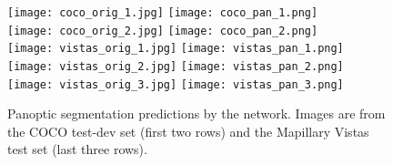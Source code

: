 \documentclass[10pt,twocolumn,letterpaper]{article}
\begin{document}
\begin{figure}[t]
\centering
\texttt{[image: coco\_orig\_1.jpg]}
\texttt{[image: coco\_pan\_1.png]}\\
\texttt{[image: coco\_orig\_2.jpg]}
\texttt{[image: coco\_pan\_2.png]}\\
\texttt{[image: vistas\_orig\_1.jpg]}
\texttt{[image: vistas\_pan\_1.png]}\\
\texttt{[image: vistas\_orig\_2.jpg]}
\texttt{[image: vistas\_pan\_2.png]}\\
\texttt{[image: vistas\_orig\_3.jpg]}
\texttt{[image: vistas\_pan\_3.png]}
\caption{Panoptic segmentation predictions by the network. Images are from the COCO test-dev set (first two rows) and the Mapillary Vistas test set (last three rows).} \label{fig:more_example_images}
\end{figure}

{\small


}
\end{document}
